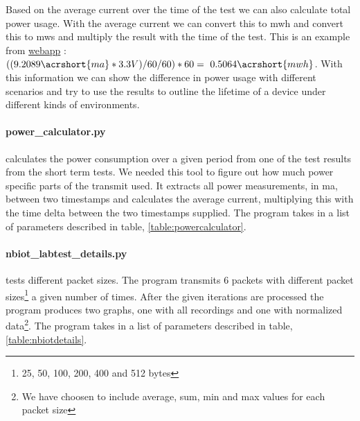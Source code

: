 \documentclass[USenglish]{ifimaster}  %
\begin{document}
Based on the average current over the time of the test we can also calculate total power usage. With the average current we can convert this to \acrshort{mwh} and convert this to \acrshort{mws} and multiply the result with the time of the test. This is an example from \href{http://158.39.77.97:9000/\#/results/UiO\_TELIA\_5.02\_precision\_2018-03-16\_1\_0x2\_60\_1\_512}{webapp} \cite{webapp:powerexample}: ${( (9.2089 \acrshort{ma} * 3.3V) / 60 / 60 ) * 60 = ~0.5064 \acrshort{mwh}}$. With this information we can show the difference in power usage with different scenarios and try to use the results to outline the lifetime of a device under different kinds of environments.

\paragraph{\textbf{power\_calculator.py}} calculates the power consumption over a given period from one of the test results from the short term tests. We needed this tool to figure out how much power specific parts of the transmit used. It extracts all power measurements, in \acrshort{ma}, between two timestamps and calculates the average current, multiplying this with the time delta between the two timestamps supplied. The program takes in a list of parameters described in table, \vref{table:powercalculator}.

\begin{table}[H]
\centering
{}
\caption{\textbf{power\_calculator.py} parameters. See \href{https://github.com/henninghaakonsen/thesis/blob/master/code/power_calculator.py}{power calculator}\cite{code:powercalc} for complete code}
\label{table:powercalculator}
\end{table}

\paragraph{\textbf{nbiot\_labtest\_details.py}} tests different packet sizes. The program transmits 6 packets with different packet sizes\footnote{25, 50, 100, 200, 400 and 512 bytes} a given number of times. After the given iterations are processed the program produces two graphs, one with all recordings and one with normalized data\footnote{We have choosen to include average, sum, min and max values for each packet size}. The program takes in a list of parameters described in table, \vref{table:nbiotdetails}.
\end{document}
